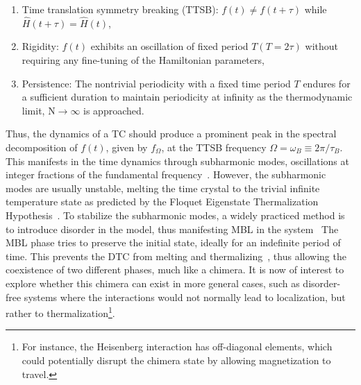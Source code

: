\documentclass[12pt]{iopart}
\begin{document}
\begin{enumerate}[label=(\alph*)]

\item 
Time translation symmetry breaking (TTSB): $f(t) \neq f(t+\tau)$ while $\hat{H}(t + \tau) =  \hat{H}(t)$, 

\item
Rigidity: $f(t)$ exhibits an oscillation of fixed period $T (T=2\tau)$ without requiring any fine-tuning of the  Hamiltonian parameters,

\item
 Persistence: The nontrivial periodicity with a fixed time period $ T $ endures for a sufficient duration to maintain periodicity at infinity as the thermodynamic limit, $\mathrm{N} \rightarrow \infty$ is approached. 
\end{enumerate}
  Thus, the dynamics of a TC should produce a prominent peak in the spectral decomposition of $f(t)$, given by $f_\Omega$, at the TTSB frequency $\Omega=\omega_B \equiv 2\pi/\tau_B$. This manifests in the time dynamics through subharmonic modes, oscillations at integer fractions of the fundamental frequency~\cite{Biao2018, russomanno_floquet_2017}. However, the subharmonic modes are usually unstable, melting the time crystal to the trivial infinite temperature state as predicted by the Floquet Eigenstate Thermalization Hypothesis~\cite{Mori_2018, Kim_2014, Mizuta_2020, Mori_2023_1}. To stabilize the subharmonic modes, a widely practiced method is to introduce  disorder in the model, thus manifesting MBL in the system~\cite{zhang_observation_2017, choi_observation_2017, Khemani2016,else_discrete_2020} The MBL phase tries to preserve the initial state, ideally for an indefinite period of time. This prevents the DTC from melting and thermalizing~\cite{zhang_observation_2017,alet_many-body_2018,else_floquet_2016,smith_many-body_2016,nguyen_signature_2021}, thus allowing the coexistence of two different phases, much like a chimera. It is now of interest to explore whether this chimera can exist in more general cases, such as disorder-free systems where the interactions would not normally lead to localization, but rather to thermalization\footnote{For instance, the Heisenberg interaction has off-diagonal elements, which could potentially disrupt the chimera state by allowing magnetization to travel.}.
\end{document}
